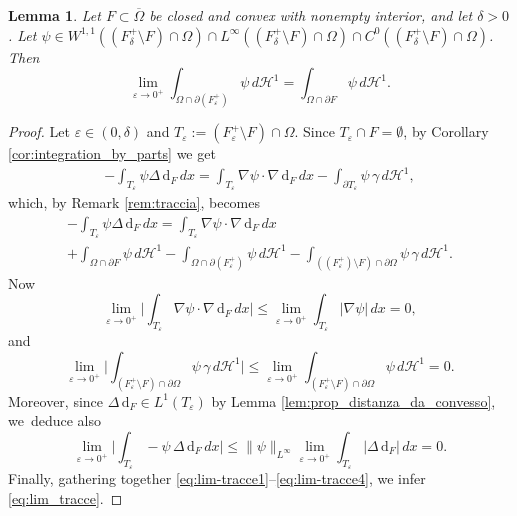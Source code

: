 \documentclass[JEP,XML,SOM,Unicode, NoFloatCountersInSection,published]{cedram}
\let\eps\varepsilon
\let\Om\Omega
\newcommand{\di}{\,\mathrm{d}}
\newtheorem{lemma}[theorem]{Lemma}
\theoremstyle{definition}
\begin{document}
\begin{lemma}\label{lem:limite_di_traccia}
Let $F\subset\overline\Om$ be closed and convex with nonempty interior,
and let $\delta>0$.
Let $\psi\in W^{1,1}((F^+_{\delta}\setminus F)\cap\Om)\cap L^\infty((F^+_{\delta}\setminus F)\cap\Om)\cap C^0((F^+_{\delta}\setminus F)\cap\Om)$. Then
\begin{equation}\label{eq:lim_tracce}
\lim_{\eps\to0^+} \int_{\Om\cap\partial(F^+_\eps)}\psi\,d\mathcal{H}^1=\int_{\Om\cap\partial F}\psi\,d\mathcal{H}^1.
\end{equation}
\end{lemma}

\begin{proof}
Let $\eps\in(0,\delta)$ and $T_\eps:=(F^+_\eps\setminus F)\cap \Omega$. Since $T_\eps\cap F=\emptyset$, by Corollary \ref{cor:integration_by_parts} we get
\begin{equation}\label{eq:lim_tracce*}
\begin{split}
-\int_{T_\eps}\psi\Delta\di_{F}\,dx
=
\int_{T_\eps} \nabla\psi\cdot\nabla\di_{F}\,dx- \int_{\partial T_\eps}\psi\,\gamma\,d\mathcal{H}^1,
\end{split}
\end{equation}
which, by Remark \ref{rem:traccia}, becomes
\begin{multline}\label{eq:lim-tracce1}
-\int_{T_\eps}\psi\Delta\di_{F}\,dx
= \int_{T_\eps} \nabla\psi\cdot\nabla\di_{F}\,dx\\
+ \int_{\Om\cap\partial F}\psi\,d\mathcal{H}^1
-\int_{\Om\cap\partial(F_\eps^+)}\psi\,d\mathcal{H}^1
-\int_{((F^+_\eps)\setminus F)\cap\partial \Om}\psi\,\gamma\,d\mathcal{H}^1.
\end{multline}
Now
\begin{equation}\label{eq:lim-tracce2}
\lim_{\eps\to0^+} \Big|\int_{T_\eps} \nabla\psi\cdot\nabla\di_{F}\,dx
\Big| \le\lim_{\eps\to0^+} \int_{T_\eps} |\nabla \psi|\,dx=0,
\end{equation}
and
\begin{equation}\label{eq:lim-tracce3}
\lim_{\eps\to0^+} \Big| \int_{(F^+_\eps\setminus F)\cap\partial\Om}\psi\,\gamma\,d\mathcal{H}^1\Big|\le
\lim_{\eps\to0^+} \int_{(F^+_\eps\setminus F)\cap\partial\Om}\psi\,d\mathcal{H}^1=0.
\end{equation}
Moreover, since $\Delta\di_{F}\in L^1(T_\eps)$ by Lemma \ref{lem:prop_distanza_da_convesso}, we~deduce also
\begin{equation}\label{eq:lim-tracce4}
\lim_{\eps\to0^+}\Big| \int_{T_\eps}-\psi\,\Delta\di_{F}\,dx\Big|\le \|\psi\|_{L^\infty}\lim_{\eps\to0^+} \int_{T_\eps}|\Delta \di_{F}|\,dx=0.
\end{equation}
Finally, gathering together \eqref{eq:lim-tracce1}--\eqref{eq:lim-tracce4}, we infer \eqref{eq:lim_tracce}.
\end{proof}
\end{document}
